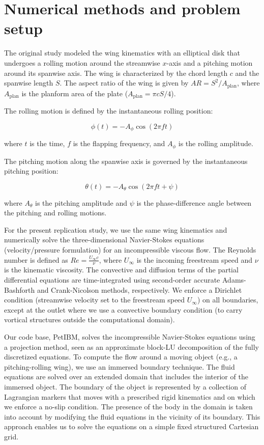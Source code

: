 \section{Numerical methods and problem setup}

The original study modeled the wing kinematics with an elliptical disk that undergoes a rolling motion around the streamwise $x$-axis and a pitching motion around its spanwise axis.
The wing is characterized by the chord length $c$ and the spanwise length $S$.
The aspect ratio of the wing is given by $AR = S^2 / A_\text{plan}$, where $A_\text{plan}$ is the planform area of the plate ($A_\text{plan} = \pi c S / 4$).

The rolling motion is defined by the instantaneous rolling position:

\begin{equation}
  \phi (t) = -A_\phi \cos \left( 2 \pi f t \right)
\end{equation}

where $t$ is the time, $f$ is the flapping frequency, and $A_\phi$ is the rolling amplitude.

The pitching motion along the spanwise axis is governed by the instantaneous pitching position:

\begin{equation}
  \theta (t) = -A_\theta \cos(2 \pi f t + \psi)
\end{equation}

where $A_\theta$ is the pitching amplitude and $\psi$ is the phase-difference angle between the pitching and rolling motions.

For the present replication study, we use the same wing kinematics and numerically solve the three-dimensional Navier-Stokes equations (velocity/pressure formulation) for an incompressible viscous flow.
The Reynolds number is defined as $Re = \frac{U_\infty c}{\nu}$, where $U_\infty$ is the incoming freestream speed and $\nu$ is the kinematic viscosity.
The convective and diffusion terms of the partial differential equations are time-integrated using second-order accurate Adams-Bashforth and Crank-Nicolson methods, respectively.
We enforce a Dirichlet condition (streamwise velocity set to the freestream speed $U_\infty$) on all boundaries, except at the outlet where we use a convective boundary condition (to carry vortical structures outside the computational domain).

Our code base, PetIBM, solves the incompressible Navier-Stokes equations using a projection method, seen as an approximate block-LU decomposition of the fully discretized equations.\supercite{perot_1993}
To compute the flow around a moving object (e.g., a pitching-rolling wing), we use an immersed boundary technique.
The fluid equations are solved over an extended domain that includes the interior of the immersed object.
The boundary of the object is represented by a collection of Lagrangian markers that moves with a prescribed rigid kinematics and on which we enforce a no-slip condition.
The presence of the body in the domain is taken into account by modifying the fluid equations in the vicinity of its boundary.
This approach enables us to solve the equations on a simple fixed structured Cartesian grid.

